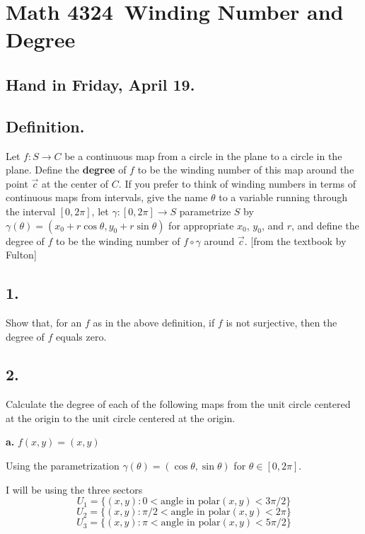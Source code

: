\documentclass{amsart}
\theoremstyle{plain}
\theoremstyle{definition}
\theoremstyle{remark}
\begin{document}
\section*{Math 4324\  Winding Number and Degree } 

\subsection*{Hand in Friday, April 19.} 

\vspace{.15in}
\subsection*{Definition.}  Let $f : S \to C$ be a continuous map from a circle in the plane to a circle in the plane. Define the {\bf degree} of $f$ to be the winding number of this map around the point $\vec{c}$ at the center of $C$. If you prefer to think of winding numbers in terms of continuous maps from intervals, give the name $\theta$ to a variable running through the interval $[0,2\pi ]$, let $\gamma : [0,2\pi ] \to S$ parametrize $S$ by $\gamma (\theta ) = (x_0 + r\cos \theta , y_0 + r\sin \theta )$ for appropriate $x_0$, $y_0$, and $r$, and define the degree of $f$ to be the winding number of $f\circ \gamma$ around $\vec{c}$. [from the textbook by Fulton]

\vspace{.15in}
\noindent
\subsection*{1.}  Show that, for an $f$ as in the above definition, if $f$ is not surjective, then the degree of $f$ equals zero. 





\vspace{.15in}
\noindent
\subsection*{2.} Calculate the degree of each of the following maps from the unit circle centered at the origin to the unit circle centered at the origin. 



\vspace{.1in}
{\bfseries a.}  $f(x,y) = (x,y)$
{
Using the parametrization $\gamma(\theta)=(\cos \theta,\sin \theta)$ for $\theta \in [0,2\pi]$. 


I will be using the three sectors  $$U_1=\{(x,y): 0< \text{angle in polar}(x,y)<3\pi/2\}$$  
$$
U_2=\{(x,y): \pi/2 < \text{angle in polar}(x,y)<2\pi\}
$$
$$
U_3=\{(x,y): \pi < \text{angle in polar}(x,y)< 5\pi/2\}
$$

}
\end{document}
